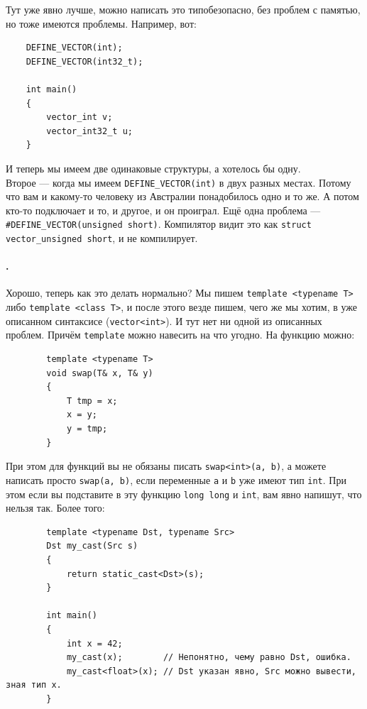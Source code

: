 \documentclass{article}
\begin{document}
    Тут уже явно лучше, можно написать это типобезопасно, без проблем с памятью, но тоже имеются проблемы. Например, вот:
    \begin{verbatim}
    DEFINE_VECTOR(int);
    DEFINE_VECTOR(int32_t);

    int main()
    {
        vector_int v;
        vector_int32_t u;
    }
    \end{verbatim}
    И теперь мы имеем две одинаковые структуры, а хотелось бы одну.\\
    Второе --- когда мы имеем \texttt{DEFINE_VECTOR(int)} в двух разных местах. Потому что вам и какому-то человеку из Австралии понадобилось одно и то же. А потом кто-то подключает и то, и другое, и он проиграл. Ещё одна проблема --- \texttt{#DEFINE_VECTOR(unsigned short)}. Компилятор видит это как \texttt{struct vector_unsigned short}, и не компилирует.
    \paragraph{.}
    Хорошо, теперь как это делать нормально? Мы пишем \texttt{template <typename T>} либо \texttt{template <class T>}, и после этого везде пишем, чего же мы хотим, в уже описанном синтаксисе (\texttt{vector<int>}). И тут нет ни одной из описанных проблем. Причём \texttt{template} можно навесить на что угодно. На функцию можно:
    \begin{verbatim}
        template <typename T>
        void swap(T& x, T& y)
        {
            T tmp = x;
            x = y;
            y = tmp;
        }
    \end{verbatim}
    При этом для функций вы не обязаны писать \texttt{swap<int>(a, b)}, а можете написать просто \texttt{swap(a, b)}, если переменные \texttt{a} и \texttt{b} уже имеют тип \texttt{int}. При этом если вы подставите в эту функцию \texttt{long long} и \texttt{int}, вам явно напишут, что нельзя так. Более того:
    \begin{verbatim}
        template <typename Dst, typename Src>
        Dst my_cast(Src s)
        {
            return static_cast<Dst>(s);
        }

        int main()
        {
            int x = 42;
            my_cast(x);        // Непонятно, чему равно Dst, ошибка.
            my_cast<float>(x); // Dst указан явно, Src можно вывести, зная тип x.
        }
    \end{verbatim}
\end{document}
